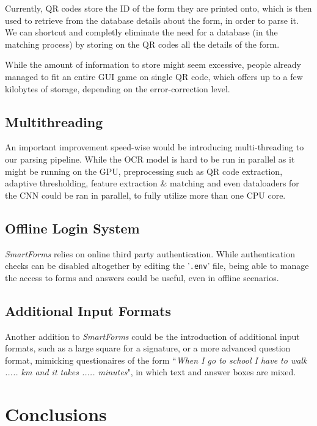 \documentclass[11pt, a4paper]{report}
\def\code#1{\texttt{#1}}
\begin{document}
Currently, QR codes store the ID of the form they are printed onto, which is then used to retrieve from the database details about the form, in order to parse it. We can shortcut and completly eliminate the need for a database (in the matching process) by storing on the QR codes all the details of the form.

While the amount of information to store might seem excessive, people already managed to fit an entire GUI game on single QR code\cite{game-qr-code}, which offers up to a few kilobytes of storage, depending on the error-correction level.

\subsection{Multithreading}

An important improvement speed-wise would be introducing multi-threading to our parsing pipeline. While the OCR model is hard to be run in parallel as it might be running on the GPU, preprocessing such as QR code extraction, adaptive thresholding, feature extraction \& matching and even dataloaders for the CNN could be ran in parallel, to fully utilize more than one CPU core. 


\subsection{Offline Login System}

\textit{SmartForms} relies on online third party authentication. While authentication checks can be disabled altogether by editing the '\code{.env}' file, being able to manage the access to forms and answers could be useful, even in offline scenarios.

\subsection{Additional Input Formats}

Another addition to \textit{SmartForms} could be the introduction of additional input formats, such as a large square for a signature, or a more advanced question format, mimicking questionaires of the form ``\textit{When I go to school I have to walk ..... km and it takes ..... minutes}", in which text and answer boxes are mixed.

\section{Conclusions}
\end{document}
